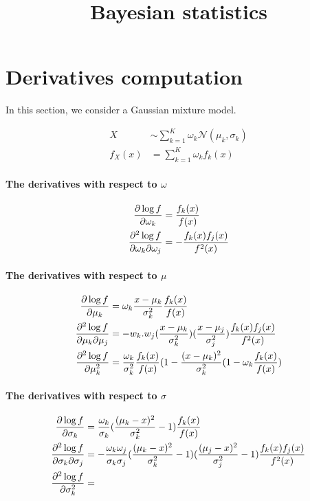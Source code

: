 \documentclass[]{article}
\title{Bayesian statistics}
\newcommand{\N}{\mathcal{N}}
\begin{document}
\maketitle
\section{Derivatives computation}
In this section, we consider a Gaussian mixture model.

\begin{align*}
X &\sim \sum_{k=1}^{K} \omega_k \N(\mu_k, \sigma_k) \\
f_X(x) &= \sum_{k=1}^K \omega_k f_k(x)
\end{align*}


\paragraph{The derivatives with respect to $\omega$}
\begin{align*}
\pdv{\log f}{\omega_k} (x) &= \frac{f_k(x)}{f(x)} \\	
\pdv{\log f}{\omega_k}{\omega_j} (x) &= - \frac{f_k(x) f_j(x)}{f^2(x)}
\end{align*}

\paragraph{The derivatives with respect to $\mu$}
\begin{align*}
	\pdv{\log f}{\mu_k} (x) &= \omega_k \frac{x - \mu_k}{\sigma_k^2} \frac{f_k(x)}{f(x)} \\
	\pdv{\log f}{\mu_k}{\mu_j} (x) &= - w_k. w_j (\frac{x - \mu_k}{\sigma_k^2}) (\frac{x - \mu_j}{\sigma_j^2}) \frac{f_k(x) f_j(x)}{f^2(x)} \\
	\pdv[2]{\log f}{\mu_k} (x) &= \frac{\omega_k}{\sigma_k^2}\frac{f_k(x)}{f(x)} (1 - \frac{(x - \mu_k)^2}{\sigma_k^2}(1 - \omega_k \frac{f_k(x)}{f(x)})
\end{align*}

\paragraph{The derivatives with respect to $\sigma$}

\begin{align*}
	\pdv{\log f}{\sigma_k} (x) &= \frac{\omega_k}{\sigma_k} ( \frac{(\mu_k -x)^2}{\sigma_k^2} - 1) \frac{f_k(x)}{f(x)} \\	
	\pdv{\log f}{\sigma_k}{\sigma_j} (x) &= - \frac{\omega_k\omega_j}{\sigma_k\sigma_j} ( \frac{(\mu_k -x)^2}{\sigma_k^2} - 1) ( \frac{(\mu_j -x)^2}{\sigma_j^2} - 1) \frac{f_k(x) f_j(x)}{f^2(x)} \\
	\pdv[2]{\log f}{\sigma_k} (x) &= 
\end{align*}
\end{document}
